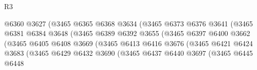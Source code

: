 \begin{lexlean}{R3}
\begin{coremodule}
                                          @6360
                                          @3627
                                          (@3465
                                            @6365
                                            @6368
                                            @3634
                                            (@3465
                                              @6373
                                              @6376
                                              @3641
                                              (@3465
                                                @6381
                                                @6384
                                                @3648
                                                (@3465
                                                  @6389
                                                  @6392
                                                  @3655
                                                  (@3465
                                                    @6397
                                                    @6400
                                                    @3662
                                                    (@3465
                                                      @6405
                                                      @6408
                                                      @3669
                                                      (@3465
                                                        @6413
                                                        @6416
                                                        @3676
                                                        (@3465
                                                          @6421
                                                          @6424
                                                          @3683
                                                          (@3465
                                                            @6429
                                                            @6432
                                                            @3690
                                                            (@3465
                                                              @6437
                                                              @6440
                                                              @3697
                                                              (@3465
                                                                @6445
                                                                @6448

\end{coremodule}
\end{lexlean}
